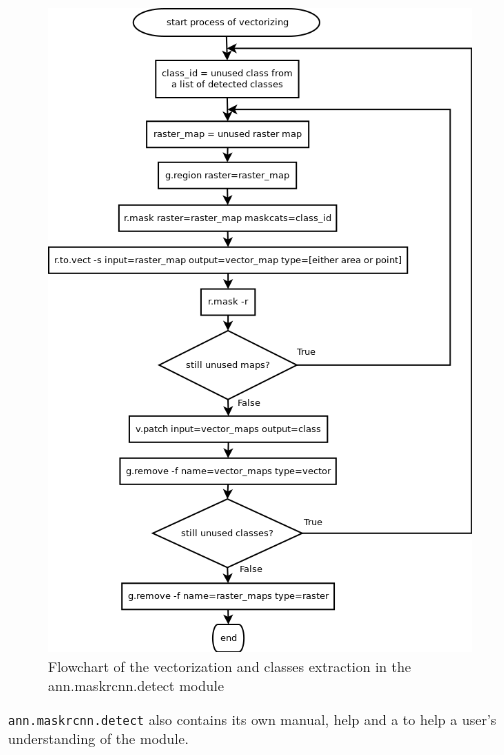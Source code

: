 \begin{figure}[H]
   \centering
	\includegraphics[width=0.95\linewidth]{./pictures/vectorize.png}
	\caption[vectorization in ann.maskrcnn.detect flowchart]{Flowchart of the vectorization and classes extraction in the ann.maskrcnn.detect module}
      \label{fig:vectorize}
\end{figure}

\verb|ann.maskrcnn.detect| also contains its own manual, help and a  to help a user's understanding of the module.
